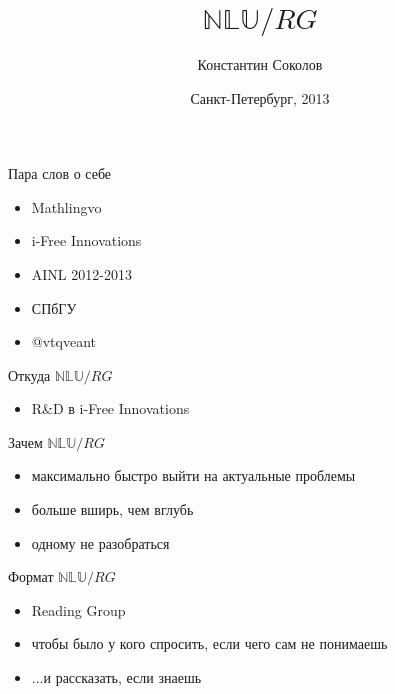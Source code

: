 \documentclass{beamer}
\begin{document}
\title{\huge{$\mathbb{NLU}/RG$}}
\author{Константин Соколов}
\date{Санкт-Петербург, 2013} 
\begin{frame}
\thispagestyle{empty}
\titlepage
\end{frame}


\begin{frame}{Пара слов о себе}
\setcounter{framenumber}{1}
\begin{itemize}
  \item Mathlingvo 
  \item i-Free Innovations
  \item AINL 2012-2013
  \item СПбГУ
  \item @vtqveant
\end{itemize}
\end{frame}

\begin{frame}{Откуда $\mathbb{NLU}/RG$}
\begin{itemize}
  \item R\&D в i-Free Innovations
\end{itemize}
\end{frame}

\begin{frame}{Зачем $\mathbb{NLU}/RG$}
\begin{itemize}
  \item максимально быстро выйти на актуальные проблемы
  \item больше вширь, чем вглубь
  \item одному не разобраться
\end{itemize}
\end{frame}

\begin{frame}{Формат $\mathbb{NLU}/RG$}
\begin{itemize}
  \item Reading Group
  \item чтобы было у кого спросить, если чего сам не понимаешь
  \item ...и рассказать, если знаешь
\end{itemize}
\end{frame}
\end{document}
